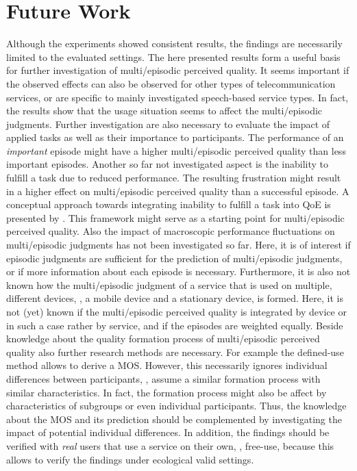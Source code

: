 \section{Future Work}
Although the experiments showed consistent results, the findings are necessarily limited to the evaluated settings.
The here presented results form a useful basis for further investigation of multi\-/episodic perceived quality.
It seems important if the observed effects can also be observed for other types of telecommunication services, or are specific to mainly investigated speech-based service types.
In fact, the results show that the usage situation seems to affect the multi\-/episodic judgments.
Further investigation are also necessary to evaluate the impact of applied tasks as well as their importance to participants.
The performance of an \emph{important} episode might have a higher multi\-/episodic perceived quality than less important episodes.
Another so far not investigated aspect is the inability to fulfill a task due to reduced performance.
The resulting frustration might result in a higher effect on multi\-/episodic perceived quality than a successful episode.
A conceptual approach towards integrating inability to fulfill a task into \ac{QoE} is presented by \citet{leon-garcia_generalizing_2014}.
This framework might serve as a starting point for multi\-/episodic perceived quality.
Also the impact of macroscopic performance fluctuations on multi\-/episodic judgments has not been investigated so far.
Here, it is of interest if episodic judgments are sufficient for the prediction of multi\-/episodic judgments, or if more information about each episode is necessary.
Furthermore, it is also not known how the multi\-/episodic judgment of a service that is used on multiple, different devices, \eg, a mobile device and a stationary device, is formed.
Here, it is not (yet) known if the multi\-/episodic perceived quality is integrated by device or in such a case rather by service, and if the episodes are weighted equally.
Beside knowledge about the quality formation process of multi\-/episodic perceived quality also further research methods are necessary.
For example the defined-use method allows to derive a \ac{MOS}.
However, this necessarily ignores individual differences between participants, \ie, assume a similar formation process with similar characteristics.
In fact, the formation process might also be affect by characteristics of subgroups or even individual participants.
Thus, the knowledge about the \ac{MOS} and its prediction should be complemented by investigating the impact of potential individual differences.
In addition, the findings should be verified with \emph{real} users that use a service on their own, \ie, free-use, because this allows to verify the findings under ecological valid settings.